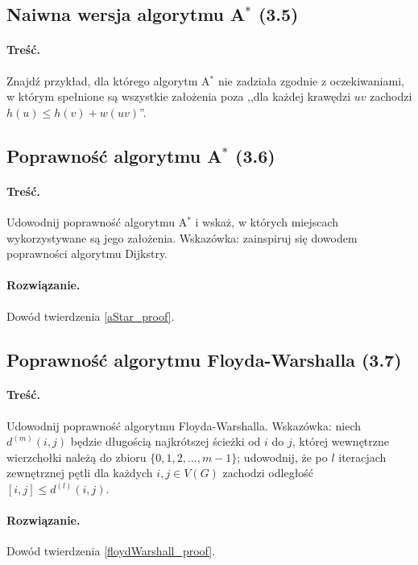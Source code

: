 \subsection{Naiwna wersja algorytmu A\texorpdfstring{$^*$}{TEXT} (3.5)}
\paragraph{Treść.}Znajdź przykład, dla 
którego algorytm A$^*$ nie zadziała zgodnie z oczekiwaniami, 
w którym spełnione
są wszystkie założenia 
poza 
,,dla każdej krawędzi $uv$ zachodzi $h(u) \leq h(v) + w(uv)$''.


\subsection{Poprawność algorytmu A\texorpdfstring{$^*$}{TEXT} (3.6)}
\paragraph{Treść.}Udowodnij poprawność algorytmu 
A$^*$ i wskaż, w których miejscach wykorzystywane są jego założenia.
Wskazówka: zainspiruj się dowodem poprawności algorytmu Dijkstry.

\paragraph{Rozwiązanie.}Dowód twierdzenia \ref{aStar_proof}.

\subsection{Poprawność algorytmu Floyda-Warshalla (3.7)}
\paragraph{Treść.}Udowodnij poprawność algorytmu Floyda-Warshalla. 
Wskazówka: niech 
$d^{(m)}(i, j)$ będzie długością
najkrótszej ścieżki od $i$ do $j$, której wewnętrzne wierzchołki należą
do zbioru $\{0, 1, 2, . . . , m - 1\}$; 
udowodnij, że po $l$
iteracjach zewnętrznej pętli dla każdych $i, j \in V (G)$ zachodzi 
odległość$[i, j] \leq d^{(l)}(i, j)$.

\paragraph{Rozwiązanie.}Dowód twierdzenia \ref{floydWarshall_proof}.

